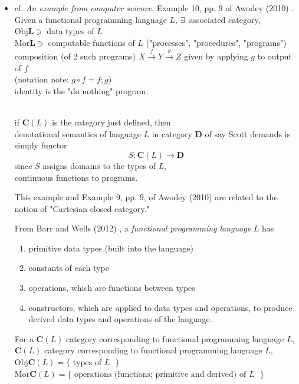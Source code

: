 \begin{itemize}
\begin{itemize}
\begin{proof}
	So $F$ itself is monotone.
	\end{proof}
\end{itemize}
\item cf. \emph{An example from computer science}, Example 10, pp. 9 of Awodey (2010) \cite{agat:Awod2010}.
Given a functional programming language $L$, $\exists \, $ associated category, \\
$\text{Obj}\mathbf{L} \ni $ data types of $L$ \\
$\text{Mor}\mathbf{L} \ni $ computable functions of $L$ ("processes", "procedures", "programs") \\
composition (of 2 such programs) $X \xrightarrow{f} Y \xrightarrow{g} Z$ given by applying $g$ to output of $f$ \\
(notation note: $g\circ f = f; g$) \\
identity is the "do nothing" program. 

\quad \\
if $\mathbf{C}(L)$ is the category just defined, then \\
denotational semantics of language $L$ in category $\mathbf{D}$ of say Scott demands is simply functor
\[
S:\mathbf{C}(L) \to \mathbf{D} 
\]
since $S$ assigns domains to the types of $L$, \\
continuous functions to programs.

This example and Example 9, pp. 9, of Awodey (2010) \cite{agat:Awod2010} are related to the notion of "Cartesian closed category."

From Barr and Wells (2012) \cite{agat:BaWe2012}, a \emph{functional programming language} $L$ has
\begin{enumerate}
	\item primitive data types (built into the language) 
	\item constants of each type
	\item operations, which are functions between types
	\item constructors, which are applied to data types and operations, to produce derived data types and operations of the language.	
\end{enumerate}

	For a $\mathbf{C}(L)$ category corresponding to functional programming language $L$, \\
	
	$\mathbf{C}(L)$ category corresponding to functional programming language $L$, \\
	$\text{Obj}\mathbf{C}(L) = \lbrace \text{ types of $L$ } \rbrace$ \\
	$\text{Mor}\mathbf{C}(L) = \lbrace \text{ operations (functions; primitive and derived) of $L$ } \rbrace$ \\


\end{itemize}
